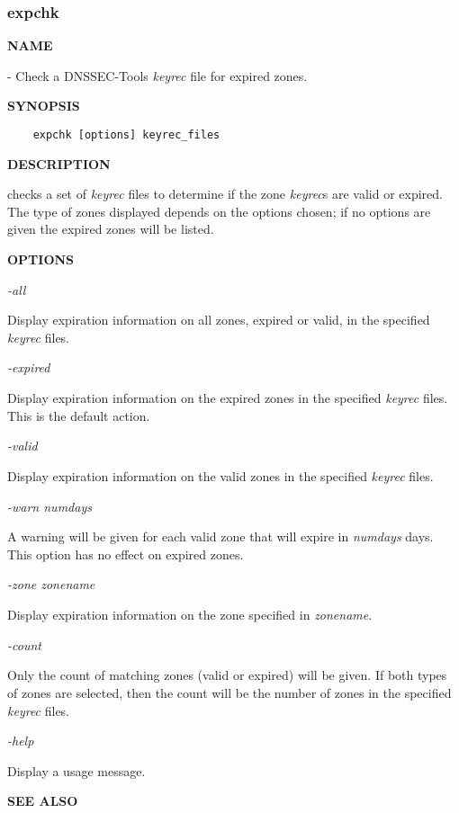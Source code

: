 \clearpage

\subsubsection{\bf expchk}

{\bf NAME}

 - Check a DNSSEC-Tools {\it keyrec} file for expired zones.

{\bf SYNOPSIS}

\begin{verbatim}
    expchk [options] keyrec_files
\end{verbatim}

{\bf DESCRIPTION}

 checks a set of {\it keyrec} files to determine if the zone
{\it keyrec}s are valid or expired.  The type of zones displayed depends
on the options chosen; if no options are given the expired zones will be
listed.

{\bf OPTIONS}

\begin{description}

\item {\it -all}\verb" "

Display expiration information on all zones, expired or valid, in the
specified {\it keyrec} files.

\item {\it -expired}\verb" "

Display expiration information on the expired zones in the specified
{\it keyrec} files.  This is the default action.

\item {\it -valid}\verb" "

Display expiration information on the valid zones in the specified
{\it keyrec} files.

\item {\it -warn numdays}\verb" "

A warning will be given for each valid zone that will expire in {\it numdays}
days.  This option has no effect on expired zones.

\item {\it -zone zonename}\verb" "

Display expiration information on the zone specified in {\it zonename}.

\item {\it -count}\verb" "

Only the count of matching zones (valid or expired) will be given.  If both
types of zones are selected, then the count will be the number of zones in the
specified {\it keyrec} files.

\item {\it -help}\verb" "

Display a usage message.

\end{description}

{\bf SEE ALSO}



